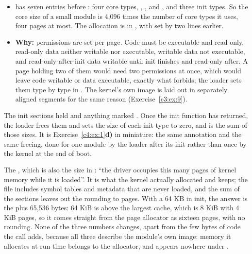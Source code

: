 \begin{itemize}
    are listed too, at addresses that have already been freed. Between groups the addresses jump,
    because each type is a separate allocation from the module area, and vmalloc leaves an unmapped
    guard page after every allocation; where two sit next to each other, a one-page group is
    followed by the next two pages further on. A module is not one block but one allocation per
    memory type, each a whole number of pages.
  \item \textbf{} has seven entries before : four
    core types, , ,  and ,
    and three init types. So the core size of a small module is 4,096 times the number of core types
    it uses, four pages at most. The allocation is 
    in , with  set by  two lines earlier.
  \item \textbf{Why:} permissions are set per page. Code must be executable and read-only, read-only
    data neither writable nor executable, writable data not executable, and read-only-after-init
    data writable until init finishes and read-only after. A page holding two of them would need
    two permissions at once, which would leave code writable or data executable, exactly what
     forbids; the loader sets them type by type in
    . The kernel's own image is laid out in separately aligned
    segments for the same reason (Exercise~\ref{c3:ex:9}).
\end{itemize}

 The init sections held  and anything marked . Once
the init function has returned, the loader frees them and sets the size of each init type to zero,
and  is the sum of those sizes. It is Exercise~\ref{c4:ex:1}\textbf{d)} in miniature:
the same annotation and the same freeing, done for one module by the loader after its init rather
than once by the kernel at the end of boot.

 The , which is also the size in : ``the driver
occupies this many pages of kernel memory while it is loaded''. It is what the kernel actually
allocated and keeps; the file includes symbol tables and metadata that are never loaded, and the
sum of the sections leaves out the rounding to pages. With a 64 KB  in init, the
answer is the  plus 65,536 bytes: 64 KiB is above the largest  cache,
which is 8 KiB with 4 KiB pages, so it comes straight from the page allocator as sixteen pages, with
no rounding. None of the three numbers changes, apart from the few bytes of code the call adds,
because all three describe the module's own image: memory it allocates at run time belongs to the
allocator, and appears nowhere under .
